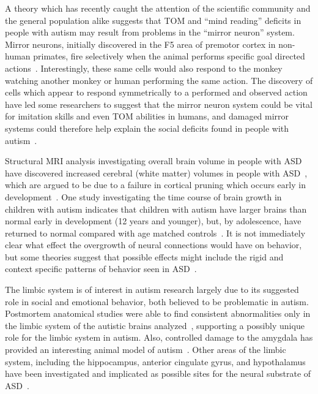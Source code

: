 A theory which has recently caught the attention of the scientific community and the general population alike suggests that TOM and ``mind reading'' deficits in people with autism may result from problems in the ``mirror neuron'' system.  Mirror neurons, initially discovered in the F5 area of premotor cortex in non-human primates,  fire selectively when the animal performs specific goal directed actions~\cite{RefWorks:140}.  Interestingly, these same cells would also respond to the monkey watching another monkey or human performing the same action.  The discovery of cells which appear to respond symmetrically to a performed and observed action have led some researchers to suggest that the mirror neuron system could be vital for imitation skills and even TOM abilities in humans, and damaged mirror systems could therefore help explain the social deficits found in people with autism~\cite{RefWorks:141,RefWorks:138}.     

Structural MRI analysis investigating overall brain volume in people with ASD have discovered increased cerebral (white matter) volumes in people with ASD~\cite{FilipekPA:1995:AutismCerebellumMRI}, which are argued to be due to a failure in cortical pruning which occurs early in development~\cite{Eigsti:2003:AutismNeuroReview}.  One study investigating the time course of brain growth in children with autism indicates that children with autism have larger brains than normal early in development (12 years and younger), but, by adolescence, have returned to normal compared with age matched controls~\cite{RefWorks:142}.  It is not immediately clear what effect the overgrowth of neural connections would have on behavior, but some theories suggest that possible effects might include the rigid and context specific patterns of behavior seen in ASD~\cite{CohenIL:1994:AutismLearning}.

The limbic system is of interest in autism research largely due to its suggested role in social and emotional behavior, both believed to be problematic in autism.  Postmortem anatomical studies were able to find consistent abnormalities only in the limbic system of the autistic brains analyzed~\cite{RefWorks:133}, supporting a possibly unique role for the limbic system in autism. Also, controlled damage to the amygdala has provided an interesting animal model of autism~\cite{BachevalierJ:1994:AutismAnimalModel}.  Other areas of the limbic system, including the hippocampus, anterior cingulate gyrus, and hypothalamus have been investigated and implicated as possible sites for the neural substrate of ASD~\cite{RefWorks:133}.  

